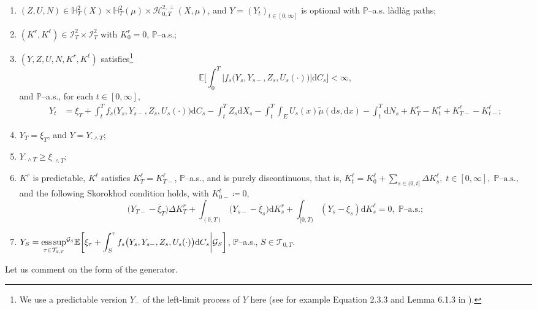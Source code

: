 \documentclass[10pt]{article} %
\newcommand\cG{\mathcal G}
\newcommand\cH{\mathcal H}
\newcommand\cI{\mathcal I}
\newcommand\cT{\mathcal T}
\newcommand{\smalltext}[1]{\text{\fontsize{4}{4}\selectfont$#1$}}
\def \E{\mathbb{E}}
\def \H{\mathbb{H}}
\def \P{\mathbb{P}}
\newcommand{\1}{\mathbf{1}}
\def\d{\mathrm{d}}
\DeclareMathOperator*{\esssup}{ess\,sup}
\begin{document}
\begin{enumerate}[{\bf (R1)}, leftmargin=0.9cm]
	\item \label{cond::integ_mart}$(Z,U,N) \in \H^2_T(X) \times \H^2_T(\mu) \times \cH^{2,\perp}_{0,T}(X,\mu)$, and $Y = (Y_t)_{t \in [0,\infty]}$ is optional with $\P$--a.s. l\`adl\`ag paths;
	\item \label{cond::integ_y_and_k} $(K^r,K^\ell) \in \cI^2_T \times  \cI^2_T$ with $K^r_0 = 0$, $\P$--a.s.;
	\item \label{cond::refl_eq} $(Y,Z,U,N,K^r,K^\ell)$ satisfies\footnote{We use a predictable version $Y_-$ of the left-limit process of $Y$ here (see for example Equation 2.3.3 and Lemma 6.1.3 in \cite{weizsaecker1990stochastic}).}
		\begin{equation*}
			\E\bigg[\int_0^T \big|f_s\big(Y_s,Y_{s-},Z_s,U_s(\cdot)\big)\big|\d C_s\bigg] < \infty,
		\end{equation*}
	and $\P$--a.s., for each $t \in [0,\infty]$,
		\begin{align*}
			Y_t &= \xi_T + \int_t^T f_s\big(Y_s,Y_{s-},Z_s,U_s(\cdot)\big) \d C_s - \int_t^T Z_s \d X_s - \int_t^T\int_E U_s(x)\tilde\mu(\d s, \d x) - \int_t^T\d N_s+ K^r_T - K^r_t + K^{\ell}_{T-} - K^{\ell}_{t-};
		\end{align*}
	\item \label{cond::y_equals_xi}$Y_T = \xi_T$, and $Y = Y_{\cdot \land T}$;
	\item \label{cond::y_greater_xi}$Y_{\cdot \land T} \geq \xi_{\cdot \land T}$;
	\item \label{cond::increasing_proc} $K^r$ is predictable, $K^\ell$ satisfies $K^\ell_T = K^\ell_{T-}$, $\P$--a.s., and is purely discontinuous, that is, $K^\ell_t = K^\ell_0 + \sum_{s \in (0,t] } \Delta K^\ell_s, \; t \in [0,\infty], \; \text{$\P$--a.s.},$
		 and the following Skorokhod condition holds, with $K^\ell_{0-} \coloneqq 0$,
		\[
		 \big(Y_{T-} - \overline{\xi}_T\big) \Delta K^r_T + \int_{(0,T)} \big(Y_{s-} - \overline{\xi}_s\big) \d K^r_s + \int_{[0,T)} (Y_s - \xi_s) \d K^\ell_s = 0, \;\text{$\P$--a.s.};
		\]
	
	\item \label{cond::repre_Y} $\displaystyle Y_S = {\esssup_{\tau \in \cT_{\smalltext{S}\smalltext{,}\smalltext{T}}}}^{\cG_\smalltext{S}} \E\bigg[ \xi_\tau + \int_S^\tau f_s\big(Y_s,Y_{s-},Z_s,U_s(\cdot)\big) \d C_s \bigg| \cG_S\bigg]$, $\P$--a.s., $S \in \cT_{0,T}$.
\end{enumerate}

Let us comment on the form of the generator.
\end{document}
